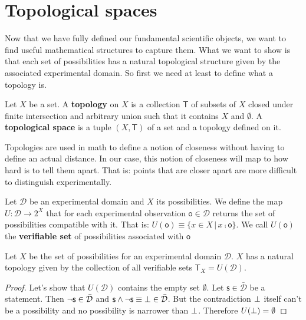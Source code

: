 \documentclass[11pt,letterpaper,fleqn]{memoir} %
\begin{document}
\section{Topological spaces}

Now that we have fully defined our fundamental scientific objects, we want to find useful mathematical structures to capture them. What we want to show is that each set of possibilities has a natural topological structure given by the associated experimental domain. So first we need at least to define what a topology is.

\begin{mathSection}
	\begin{defn}
		Let $X$ be a set. A \textbf{topology} on $X$ is a collection $\mathsf{T}$ of subsets of $X$ closed under finite intersection and arbitrary union such that it contains $X$ and $\emptyset$. A \textbf{topological space} is a tuple $(X, \mathsf{T})$ of a set and a topology defined on it.
	\end{defn}
\end{mathSection}

Topologies are used in math to define a notion of closeness without having to define an actual distance. In our case, this notion of closeness will map to how hard is to tell them apart. That is: points that are closer apart are more difficult to distinguish experimentally.

\begin{mathSection}
	
\begin{defn}
	Let $\mathcal{D}$ be an experimental domain and $X$ its possibilities. We define the map $U : \mathcal{D} \rightarrow 2^X$ that for each experimental observation $\mathsf{o} \in \mathcal{D}$ returns the set of possibilities compatible with it. That is: $U(\mathsf{o})\equiv\{ x \in X \, | \, x \comp \mathsf{o}\}$. We call $U(\mathsf{o})$ the \textbf{verifiable set} of possibilities associated with $\mathsf{o}$
\end{defn}

\end{mathSection}

\begin{mathSection}

\begin{prop}
	Let $X$ be the set of possibilities for an experimental domain $\mathcal{D}$. $X$ has a natural topology given by the collection of all verifiable sets $\mathsf{T}_X=U(\mathcal{D})$.
\end{prop}

\begin{proof}
	Let's show that $U(\mathcal{D})$ contains the empty set $\emptyset$. Let $\mathsf{s} \in \bar{\mathcal{D}}$ be a statement. Then $\neg\mathsf{s} \in \bar{\mathcal{D}}$ and $\mathsf{s} \wedge \neg\mathsf{s} \equiv \bot \in \bar{\mathcal{D}}$. But the contradiction $\bot$ itself can't be a possibility and no possibility is narrower than $\bot$. Therefore $U(\bot) = \emptyset$
\end{proof}
\end{mathSection}
\end{document}
